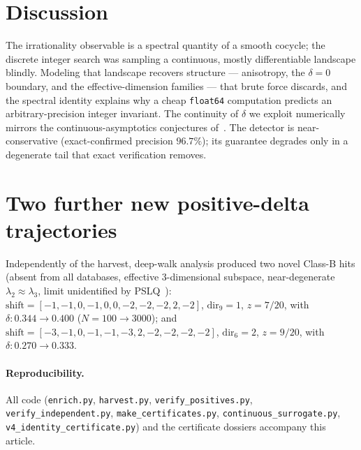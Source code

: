 \documentclass[11pt,a4paper]{article}
\theoremstyle{definition}
\begin{document}
\section{Discussion}
The irrationality observable is a spectral quantity of a smooth cocycle; the discrete integer
search was sampling a continuous, mostly differentiable landscape blindly. Modeling that
landscape recovers structure --- anisotropy, the $\delta=0$ boundary, and the
effective-dimension families --- that brute force discards, and the spectral identity explains
why a cheap \texttt{float64} computation predicts an arbitrary-precision integer invariant.
The continuity of $\delta$ we exploit numerically mirrors the continuous-asymptotics
conjectures of~\cite{cmfcont2025}. The detector is near-conservative (exact-confirmed precision
$96.7\%$); its guarantee degrades only in a degenerate tail that exact verification removes.

\section{Two further new positive-delta trajectories}
Independently of the harvest, deep-walk analysis produced two novel Class-B hits (absent from
all databases, effective $3$-dimensional subspace, near-degenerate $\lambda_2\approx\lambda_3$,
limit unidentified by PSLQ~\cite{pslq1999}):
$\mathrm{shift}=[-1,-1,0,-1,0,0,-2,-2,-2,2,-2]$, $\mathrm{dir}_9=1$, $z=7/20$, with
$\delta:0.344\to0.400$ ($N=100\to3000$); and
$\mathrm{shift}=[-3,-1,0,-1,-1,-3,2,-2,-2,-2,-2]$, $\mathrm{dir}_6=2$, $z=9/20$, with
$\delta:0.270\to0.333$.

\paragraph{Reproducibility.} All code (\texttt{enrich.py}, \texttt{harvest.py},
\texttt{verify\_positives.py}, \texttt{verify\_independent.py}, \texttt{make\_certificates.py},
\texttt{continuous\_surrogate.py}, \texttt{v4\_identity\_certificate.py}) and the certificate
dossiers accompany this article.
\end{document}
